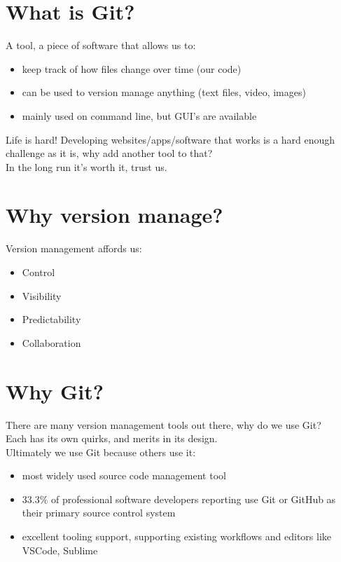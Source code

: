 
\section{What is Git?}

A tool, a piece of software that allows us to:

\begin{itemize}
    \item keep track of how files change over time (our code)
    \item can be used to version manage anything (text files, video, images)
    \item mainly used on command line, but GUI's are available
\end{itemize}

\begin{infobox}{Life is hard!}
    Developing websites/apps/software that works is a hard enough challenge as it is, why add another tool to that?
    \\

    In the long run it's worth it, trust us.
\end{infobox}

\section{Why version manage?}

Version management affords us:

\begin{itemize}
    \item Control
    \item Visibility
    \item Predictability
    \item Collaboration
\end{itemize}

\section{Why Git?}

There are many version management tools out there, why do we use Git?
\\

Each has its own quirks, and merits in its design.
\\

Ultimately we use Git because others use it:

\begin{itemize}
    \item most widely used source code management tool
	\item 33.3\% of professional software developers reporting use Git or GitHub as their primary source control system
	\item excellent tooling support, supporting existing workflows and editors like VSCode, Sublime
\end{itemize}